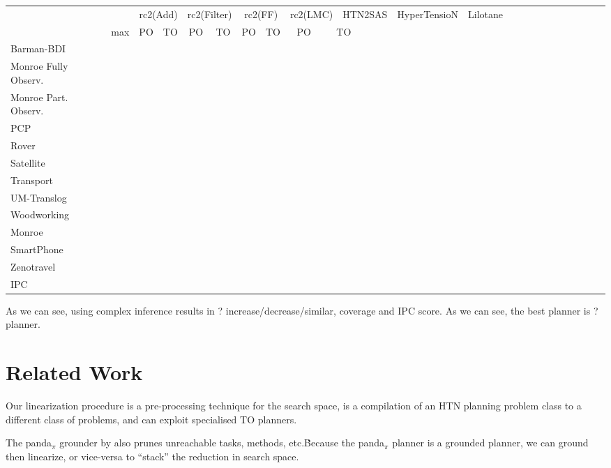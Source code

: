 \documentclass[letterpaper]{article} %
\begin{document}
\begin{table}[h]
	\scalebox{0.45} {
		\begin{tabular}{lccccccccccccccccccccccccl} 
			\toprule 
			&& \multicolumn{2}{c}{rc2(Add)} & \multicolumn{2}{c}{rc2(Filter)} & \multicolumn{2}{c}{rc2(FF)} & \multicolumn{2}{c}{rc2(LMC)}  & \multicolumn{2}{c}{HTN2SAS} & \multicolumn{2}{c}{HyperTensioN} & \multicolumn{2}{c}{Lilotane} \\ 
			\cmidrule(lr){3-4} \cmidrule(lr){5-6} \cmidrule(lr){7-8} \cmidrule(lr){9-10} \cmidrule(lr){11-12}  \cmidrule(lr){13-14} \cmidrule(lr){15-16}    
			& max &PO & TO & PO & TO & PO & TO & PO &\multicolumn{2}{c}{ TO  }  \\ 
			\midrule 
			Barman-BDI  \\ 
			Monroe Fully Observ. \\ 
			Monroe Part. Observ. \\ 
			PCP\\ 
			Rover  \\ 
			Satellite  \\ 
			Transport \\ 
			UM-Translog \\ 
			Woodworking \\ 
			\midrule 
			Monroe  \\ 
			SmartPhone \\ 
			Zenotravel \\ 
			\midrule 
			IPC \\
			\bottomrule
		\end{tabular} 	
	}
\end{table}


As we can see, using complex inference results in ?  increase/decrease/similar, coverage and IPC score.
As we can see, the best planner is ? planner.

\section{Related Work}
Our linearization procedure is a pre-processing technique for the search space, is a compilation of an HTN planning problem class to a different class of problems, and can exploit specialised TO planners.

The panda$_\pi$ grounder by \cite{Behnke2020Grounding} also prunes unreachable tasks, methods, etc.\.  Because the panda$_{\pi}$ planner is a grounded planner, we can ground then linearize, or vice-versa to \enquote{stack} the reduction in search space.
\end{document}
